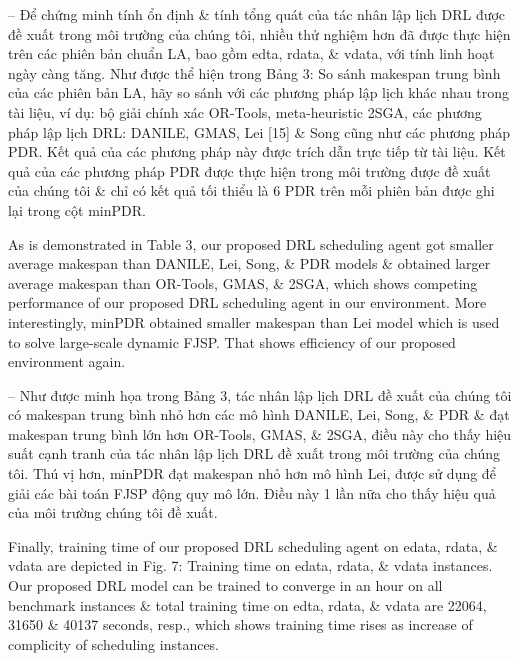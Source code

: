 \documentclass{article}
\begin{document}
\begin{itemize}
\begin{itemize}
        -- Để chứng minh tính ổn định \& tính tổng quát của tác nhân lập lịch DRL được đề xuất trong môi trường của chúng tôi, nhiều thử nghiệm hơn đã được thực hiện trên các phiên bản chuẩn LA, bao gồm edta, rdata, \& vdata, với tính linh hoạt ngày càng tăng. Như được thể hiện trong {\sf Bảng 3: So sánh makespan trung bình của các phiên bản LA}, hãy so sánh với các phương pháp lập lịch khác nhau trong tài liệu, ví dụ: bộ giải chính xác OR-Tools, meta-heuristic 2SGA, các phương pháp lập lịch DRL: DANILE, GMAS, Lei [15] \& Song cũng như các phương pháp PDR. Kết quả của các phương pháp này được trích dẫn trực tiếp từ tài liệu. Kết quả của các phương pháp PDR được thực hiện trong môi trường được đề xuất của chúng tôi \& chỉ có kết quả tối thiểu là 6 PDR trên mỗi phiên bản được ghi lại trong cột minPDR.

        As is demonstrated in Table 3, our proposed DRL scheduling agent got smaller average makespan than DANILE, Lei, Song, \& PDR models \& obtained larger average makespan than OR-Tools, GMAS, \& 2SGA, which shows competing performance of our proposed DRL scheduling agent in our environment. More interestingly, minPDR obtained smaller makespan than Lei model which is used to solve large-scale dynamic FJSP. That shows efficiency of our proposed environment again.

        -- Như được minh họa trong Bảng 3, tác nhân lập lịch DRL đề xuất của chúng tôi có makespan trung bình nhỏ hơn các mô hình DANILE, Lei, Song, \& PDR \& đạt makespan trung bình lớn hơn OR-Tools, GMAS, \& 2SGA, điều này cho thấy hiệu suất cạnh tranh của tác nhân lập lịch DRL đề xuất trong môi trường của chúng tôi. Thú vị hơn, minPDR đạt makespan nhỏ hơn mô hình Lei, được sử dụng để giải các bài toán FJSP động quy mô lớn. Điều này 1 lần nữa cho thấy hiệu quả của môi trường chúng tôi đề xuất.

        Finally, training time of our proposed DRL scheduling agent on edata, rdata, \& vdata are depicted in {\sf Fig. 7: Training time on edata, rdata, \& vdata instances.} Our proposed DRL model can be trained to converge in an hour on all benchmark instances \& total training time on edta, rdata, \& vdata are 22064, 31650 \& 40137 seconds, resp., which shows training time rises as increase of complicity of scheduling instances.


\end{itemize}
\end{itemize}
\end{document}
